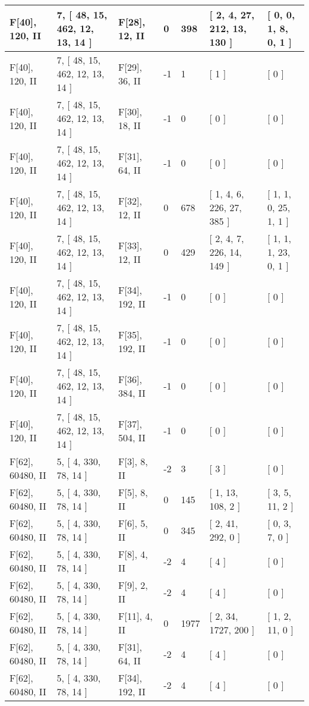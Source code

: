 \documentclass[9 pt]{scrartcl}
\begin{document}
\begin{longtable}{ |p{3em}|p{6em}|p{3em}|p{2em}|p{2em}|p{6em}|p{6em}| }
F[40], 120, II &7, [ 48, 15, 462, 12, 13, 14 ] & F[28], 12, II  & 0 & 398 & [ 2, 4, 27, 212, 13, 130 ] & [ 0, 0, 1, 8, 0, 1 ]\\ \hline
F[40], 120, II &7, [ 48, 15, 462, 12, 13, 14 ] & F[29], 36, II  & -1 & 1 & [ 1 ] & [ 0 ]\\ \hline
F[40], 120, II &7, [ 48, 15, 462, 12, 13, 14 ] & F[30], 18, II  & -1 & 0 & [ 0 ] & [ 0 ]\\ \hline
F[40], 120, II &7, [ 48, 15, 462, 12, 13, 14 ] & F[31], 64, II  & -1 & 0 & [ 0 ] & [ 0 ]\\ \hline
F[40], 120, II &7, [ 48, 15, 462, 12, 13, 14 ] & F[32], 12, II  & 0 & 678 & [ 1, 4, 6, 226, 27, 385 ] & [ 1, 1, 0, 25, 1, 1 ]\\ \hline
F[40], 120, II &7, [ 48, 15, 462, 12, 13, 14 ] & F[33], 12, II  & 0 & 429 & [ 2, 4, 7, 226, 14, 149 ] & [ 1, 1, 1, 23, 0, 1 ]\\ \hline
F[40], 120, II &7, [ 48, 15, 462, 12, 13, 14 ] & F[34], 192, II  & -1 & 0 & [ 0 ] & [ 0 ]\\ \hline
F[40], 120, II &7, [ 48, 15, 462, 12, 13, 14 ] & F[35], 192, II  & -1 & 0 & [ 0 ] & [ 0 ]\\ \hline
F[40], 120, II &7, [ 48, 15, 462, 12, 13, 14 ] & F[36], 384, II  & -1 & 0 & [ 0 ] & [ 0 ]\\ \hline
F[40], 120, II &7, [ 48, 15, 462, 12, 13, 14 ] & F[37], 504, II  & -1 & 0 & [ 0 ] & [ 0 ]\\ \hline
F[62], 60480, II &5, [ 4, 330, 78, 14 ] & F[3], 8, II  & -2 & 3 & [ 3 ] & [ 0 ]\\ \hline
F[62], 60480, II &5, [ 4, 330, 78, 14 ] & F[5], 8, II  & 0 & 145 & [ 1, 13, 108, 2 ] & [ 3, 5, 11, 2 ]\\ \hline
F[62], 60480, II &5, [ 4, 330, 78, 14 ] & F[6], 5, II  & 0 & 345 & [ 2, 41, 292, 0 ] & [ 0, 3, 7, 0 ]\\ \hline
F[62], 60480, II &5, [ 4, 330, 78, 14 ] & F[8], 4, II  & -2 & 4 & [ 4 ] & [ 0 ]\\ \hline
F[62], 60480, II &5, [ 4, 330, 78, 14 ] & F[9], 2, II  & -2 & 4 & [ 4 ] & [ 0 ]\\ \hline
F[62], 60480, II &5, [ 4, 330, 78, 14 ] & F[11], 4, II  & 0 & 1977 & [ 2, 34, 1727, 200 ] & [ 1, 2, 11, 0 ]\\ \hline
F[62], 60480, II &5, [ 4, 330, 78, 14 ] & F[31], 64, II  & -2 & 4 & [ 4 ] & [ 0 ]\\ \hline
F[62], 60480, II &5, [ 4, 330, 78, 14 ] & F[34], 192, II  & -2 & 4 & [ 4 ] & [ 0 ]\\ \hline

\end{longtable}
\end{document}
